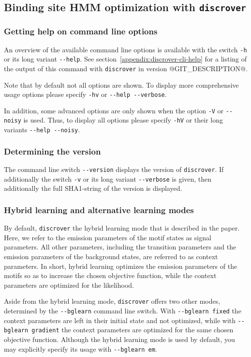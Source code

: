 \documentclass[a4paper]{article}
\makeatletter
\newcommand{\discrover}[0]{\texttt{discrover}}
\newcommand{\version}[0]{@GIT_DESCRIPTION@}
\makeatother
\begin{document}
\subsection{Binding site HMM optimization with \discrover{}}
\label{subsection:running-discrover}
\subsubsection{Getting help on command line options}
An overview of the available command line options is available with the switch \verb|-h| or its long variant \verb|--help|.
See section~\ref{appendix:discrover-cli-help} for a listing of the output of this command with \discrover{} in version \version{}.

Note that by default not all options are shown.
To display more comprehensive usage options please specify \verb|-hv| or \verb|--help --verbose|.

In addition, some advanced options are only shown when the option \verb|-V| or \verb|--noisy| is used.
Thus, to display all options please specify \verb|-hV| or their long variants \verb|--help --noisy|.

\subsubsection{Determining the version}
The command line switch \verb|--version| displays the version of \discrover{}.
If additionally the switch \verb|-v| or its long variant \verb|--verbose| is given, then additionally the full SHA1-string of the version is displayed.

\subsubsection{Hybrid learning and alternative learning modes}
\label{section:hybrid-learning}
By default, \discrover{} the hybrid learning mode that is described in the paper.
Here, we refer to the emission parameters of the motif states as signal parameters.
All other parameters, including the transition parameters and the emission parameters of the background states, are referred to as context parameters.
In short, hybrid learning optimizes the emission parameters of the motifs so as to increase the chosen objective function, while the context parameters are optimized for the likelihood.

Aside from the hybrid learning mode, \discrover{} offers two other modes, determined by the \verb|--bglearn| command line switch.
With \verb|--bglearn fixed| the context parameters are left in their initial state and not optimized, while with \verb|--bglearn gradient| the context parameters are optimized for the same chosen objective function.
Although the hybrid learning mode is used by default, you may explicitly specify its usage with \verb|--bglearn em|.
\end{document}
